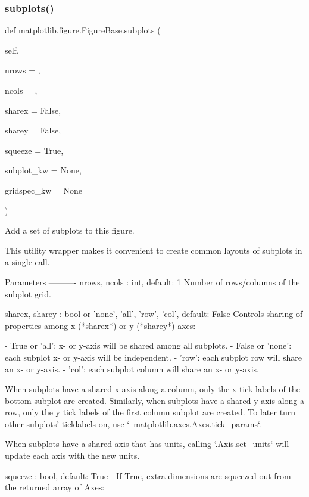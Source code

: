 \begin{DoxyVerb}
\begin{DoxyVerb}
\subsubsection{\texorpdfstring{subplots()}{subplots()}}
{\footnotesize\ttfamily def matplotlib.\+figure.\+Figure\+Base.\+subplots (\begin{DoxyParamCaption}\item[{}]{self,  }\item[{}]{nrows = {},  }\item[{}]{ncols = {},  }\item[{}]{sharex = {\ttfamily False},  }\item[{}]{sharey = {\ttfamily False},  }\item[{}]{squeeze = {\ttfamily True},  }\item[{}]{subplot\+\_\+kw = {\ttfamily None},  }\item[{}]{gridspec\+\_\+kw = {\ttfamily None} }\end{DoxyParamCaption})}

\begin{DoxyVerb}Add a set of subplots to this figure.

This utility wrapper makes it convenient to create common layouts of
subplots in a single call.

Parameters
----------
nrows, ncols : int, default: 1
    Number of rows/columns of the subplot grid.

sharex, sharey : bool or {'none', 'all', 'row', 'col'}, default: False
    Controls sharing of properties among x (*sharex*) or y (*sharey*)
    axes:

    - True or 'all': x- or y-axis will be shared among all subplots.
    - False or 'none': each subplot x- or y-axis will be independent.
    - 'row': each subplot row will share an x- or y-axis.
    - 'col': each subplot column will share an x- or y-axis.

    When subplots have a shared x-axis along a column, only the x tick
    labels of the bottom subplot are created. Similarly, when subplots
    have a shared y-axis along a row, only the y tick labels of the
    first column subplot are created. To later turn other subplots'
    ticklabels on, use `~matplotlib.axes.Axes.tick_params`.

    When subplots have a shared axis that has units, calling
    `.Axis.set_units` will update each axis with the new units.

squeeze : bool, default: True
    - If True, extra dimensions are squeezed out from the returned
      array of Axes:


\end{DoxyVerb}
\end{DoxyVerb}
\end{DoxyVerb}
